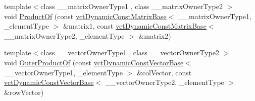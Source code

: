 \begin{DoxyCompactItemize}
\item 
{\footnotesize template$<$class \-\_\-\-\_\-matrix\-Owner\-Type1 , class \-\_\-\-\_\-matrix\-Owner\-Type2 $>$ }\\void \hyperlink{classvct_dynamic_matrix_base_a37c498d1fd0e8178b067f8537f5baf08}{Product\-Of} (const \hyperlink{classvct_dynamic_const_matrix_base}{vct\-Dynamic\-Const\-Matrix\-Base}$<$ \-\_\-\-\_\-matrix\-Owner\-Type1, \-\_\-element\-Type $>$ \&matrix1, const \hyperlink{classvct_dynamic_const_matrix_base}{vct\-Dynamic\-Const\-Matrix\-Base}$<$ \-\_\-\-\_\-matrix\-Owner\-Type2, \-\_\-element\-Type $>$ \&matrix2)
\item 
{\footnotesize template$<$class \-\_\-\-\_\-vector\-Owner\-Type1 , class \-\_\-\-\_\-vector\-Owner\-Type2 $>$ }\\void \hyperlink{classvct_dynamic_matrix_base_a6f6384546a0a1bc3ce2184b3c64ee628}{Outer\-Product\-Of} (const \hyperlink{classvct_dynamic_const_vector_base}{vct\-Dynamic\-Const\-Vector\-Base}$<$ \-\_\-\-\_\-vector\-Owner\-Type1, \-\_\-element\-Type $>$ \&col\-Vector, const \hyperlink{classvct_dynamic_const_vector_base}{vct\-Dynamic\-Const\-Vector\-Base}$<$ \-\_\-\-\_\-vector\-Owner\-Type2, \-\_\-element\-Type $>$ \&row\-Vector)
\end{DoxyCompactItemize}
